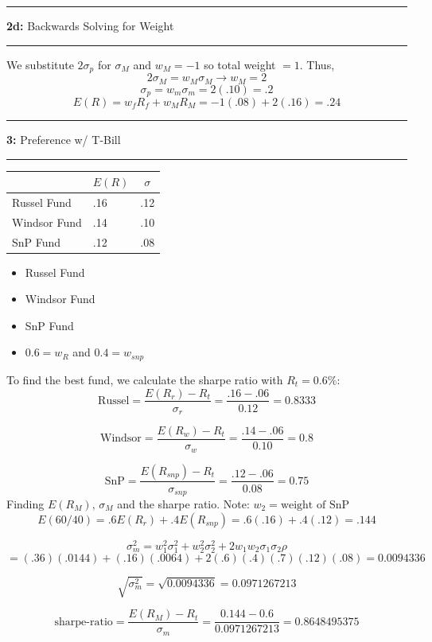 \documentclass[11pt]{article}
\newcommand\question[2]{\vspace{.25in}\hrule\textbf{#1: } #2\vspace{.5em}\hrule\vspace{.10in}}
\begin{document}
\question{2d}{Backwards Solving for Weight} 
We substitute $2\sigma_p$ for $\sigma_M$ and $w_M=-1$ so total weight $=1$. Thus,
$$
    2\sigma_M = w_M \sigma_M \rightarrow w_M = 2
$$
$$
    \sigma_p = w_m \sigma_m = 2(.10) = .2
$$
$$
    E(R) = w_fR_f + w_M R_M = -1(.08) + 2(.16) = .24
$$
\question{3}{Preference w/ T-Bill} 
\begin{table}[h]
    \begin{center}
        \begin{tabular}[c]{l|l|l}
            \hline
            \multicolumn{1}{c}{\textbf{  }} & 
            \multicolumn{1}{c}{\textbf{$E(R)$}} &
            \multicolumn{1}{c}{\textbf{$\sigma$}} \\
            \hline
            Russel Fund & .16 & .12 \\
            Windsor Fund & .14 & .10 \\
            SnP Fund & .12 & .08 \\
            \hline
        \end{tabular}
    \end{center}
\end{table}

\begin{itemize}
    \item Russel Fund
    \item Windsor Fund
    \item SnP Fund
    \item $0.6 = w_R$ and $0.4 = w_{snp}$
\end{itemize}

To find the best fund, we calculate the sharpe ratio with $R_t=0.6\%$:
\[
    \text{Russel} = \frac{E(R_r) - R_t}{\sigma_r} = \frac{.16-.06}{0.12} = 0.8333
\]

\[
    \text{Windsor} = \frac{E(R_w) - R_t}{\sigma_w} = \frac{.14-.06}{0.10} = 0.8
\]

\[
    \text{SnP} = \frac{E(R_{snp}) - R_t}{\sigma_{snp}} = \frac{.12-.06}{0.08} = 0.75
\]
Finding $E(R_M) \text{, } \sigma_M $ and the sharpe ratio. Note: $w_2 = \text{weight of SnP}$
\[
    E(\text{60/40}) = .6E(R_r) + .4E(R_{snp}) = .6(.16) + .4(.12) = .144
\]

\[
    \sigma^2_m = w^2_1 \sigma^2_1 + w^2_2 \sigma^2_2 + 2w_1w_2\sigma_1 \sigma_2 \rho 
\]
\[
    = (.36)(.0144)+(.16)(.0064)+2(.6)(.4)(.7)(.12)(.08)=0.0094336
\]

\[
    \sqrt{\sigma^2_m} = \sqrt{0.0094336} = 0.0971267213
\]

\[
    \text{sharpe-ratio} = \frac{E(R_M) - R_t}{\sigma_m} = \frac{0.144 - 0.6}{0.0971267213} = 0.8648495375
\]
\end{document}

